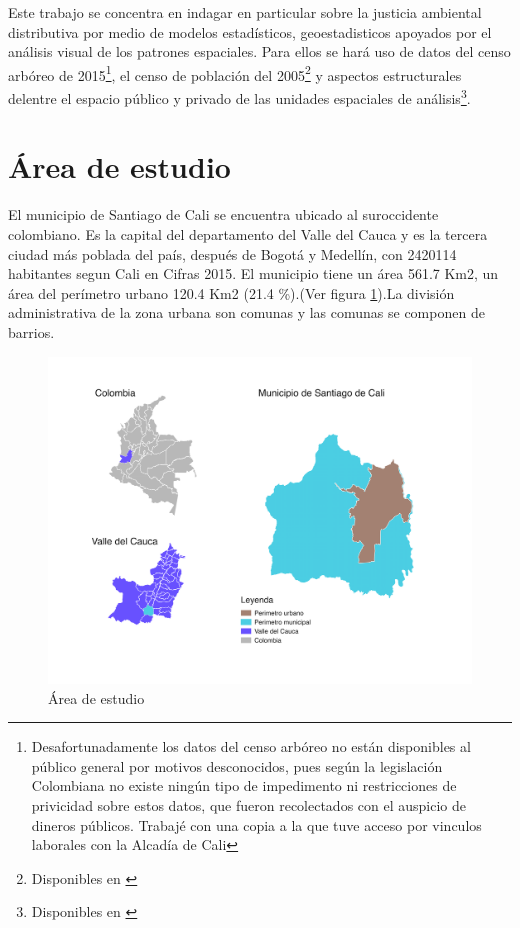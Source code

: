 \documentclass[12pt,]{book}
\let\rmarkdownfootnote\footnote%
\def\footnote{\protect\rmarkdownfootnote}
\begin{document}
Este trabajo se concentra en indagar en particular sobre la justicia
ambiental distributiva por medio de modelos estadísticos,
geoestadisticos apoyados por el análisis visual de los patrones
espaciales. Para ellos se hará uso de datos del censo arbóreo de
2015\footnote{Desafortunadamente los datos del censo arbóreo no están
  disponibles al público general por motivos desconocidos, pues según la
  legislación Colombiana no existe ningún tipo de impedimento ni
  restricciones de privicidad sobre estos datos, que fueron recolectados
  con el auspicio de dineros públicos. Trabajé con una copia a la que
  tuve acceso por vinculos laborales con la Alcadía de Cali}, el censo
de población del 2005\footnote{Disponibles en
  \citep{censo_sistema_dane, dane_cepal_celade_2005, geoportal_DANE}} y
aspectos estructurales delentre el espacio público y privado de las
unidades espaciales de análisis\footnote{Disponibles en
  \citep{geoportal_idesc, noauthor_plan_nodate}}.

\section{Área de estudio}\label{area-de-estudio}

El municipio de Santiago de Cali se encuentra ubicado al suroccidente
colombiano. Es la capital del departamento del Valle del Cauca y es la
tercera ciudad más poblada del país, después de Bogotá y Medellín, con
2420114 habitantes segun Cali en Cifras 2015. El municipio tiene un área
561.7 Km2, un área del perímetro urbano 120.4 Km2 (21.4 \%).(Ver figura
\ref{fig:ubicacion}).La división administrativa de la zona urbana son
comunas y las comunas se componen de barrios.

\begin{figure}
\includegraphics[width=1\linewidth]{QGIS/mapas/ubicacion_cali_low} \caption{Área de estudio}\label{fig:ubicacion}
\end{figure}
\end{document}

